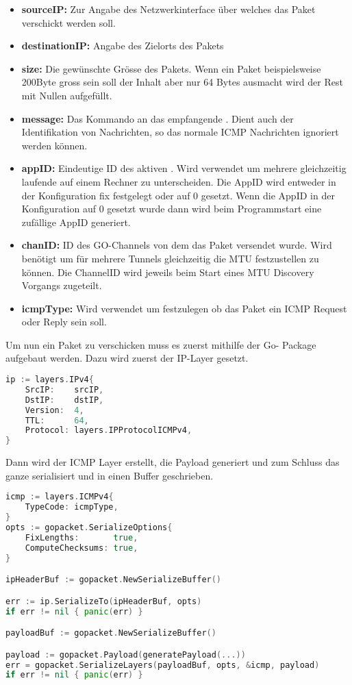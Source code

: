 \begin{itemize}
\item \textbf{sourceIP:} Zur Angabe des Netzwerkinterface über welches das Paket verschickt werden soll.
\item \textbf{destinationIP:} Angabe des Zielorts des Pakets
\item \textbf{size:} Die gewünschte Grösse des Pakets. Wenn ein Paket beispielsweise 200Byte gross sein soll der Inhalt aber nur 64 Bytes ausmacht wird der Rest mit Nullen aufgefüllt.
\item \textbf{message:} Das Kommando an das empfangende \tool{}. Dient auch der Identifikation von Nachrichten, so das normale \ac{ICMP} Nachrichten ignoriert werden können.
\item \textbf{appID:} Eindeutige ID des aktiven \tool{}. Wird verwendet um mehrere gleichzeitig laufende \tool{} auf einem Rechner zu unterscheiden. Die AppID wird entweder in der Konfiguration fix festgelegt oder auf 0 gesetzt. Wenn die AppID in der Konfiguration auf 0 gesetzt wurde dann wird beim Programmstart eine zufällige AppID generiert.
\item \textbf{chanID:} ID des GO-Channels von dem das Paket versendet wurde. Wird benötigt um für mehrere Tunnels gleichzeitig die \acs{MTU} festzustellen zu können. Die ChannelID wird jeweils beim Start eines \acs{MTU} Discovery Vorgangs zugeteilt.
\item \textbf{icmpType:} Wird verwendet um festzulegen ob das Paket ein \ac{ICMP} Request oder Reply sein soll. 
\end{itemize}

Um nun ein Paket zu verschicken muss es zuerst mithilfe der Go-  Package aufgebaut werden. Dazu wird zuerst der IP-Layer gesetzt.

\begin{lstlisting}[language=go, caption=IP Layer aufbauen]  
ip := layers.IPv4{
	SrcIP:    srcIP,
	DstIP:    dstIP,
	Version:  4,
	TTL:      64,
	Protocol: layers.IPProtocolICMPv4,
}
\end{lstlisting}

Dann wird der ICMP Layer erstellt, die Payload generiert und zum Schluss das ganze serialisiert und in einen Buffer geschrieben.

\begin{lstlisting}[language=go, caption=ICMP Layer aufbauen]  
icmp := layers.ICMPv4{
	TypeCode: icmpType,
}
opts := gopacket.SerializeOptions{
	FixLengths:       true,
	ComputeChecksums: true,
}

ipHeaderBuf := gopacket.NewSerializeBuffer()

err := ip.SerializeTo(ipHeaderBuf, opts)
if err != nil { panic(err) }

payloadBuf := gopacket.NewSerializeBuffer()

payload := gopacket.Payload(generatePayload(...))
err = gopacket.SerializeLayers(payloadBuf, opts, &icmp, payload)
if err != nil { panic(err) }
\end{lstlisting}

